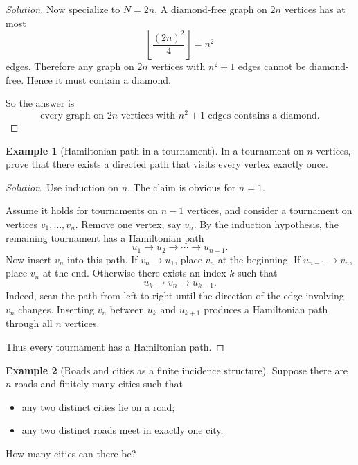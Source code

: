 \documentclass[11pt]{article}
\theoremstyle{definition}
\newtheorem{example}{Example}[section]
\begin{document}
\begin{proof}[Solution]
Now specialize to $N=2n$. A diamond-free graph on $2n$ vertices has at most
\[
\left\lfloor \frac{(2n)^2}{4}\right\rfloor = n^2
\]
edges. Therefore any graph on $2n$ vertices with $n^2+1$ edges cannot be diamond-free. Hence it must contain a diamond.

So the answer is
\[
\boxed{\text{every graph on }2n\text{ vertices with }n^2+1\text{ edges contains a diamond}.}
\]
\end{proof}

\begin{example}[Hamiltonian path in a tournament]
In a tournament on $n$ vertices, prove that there exists a directed path that visits every vertex exactly once.
\end{example}

\begin{proof}[Solution]
Use induction on $n$. The claim is obvious for $n=1$.

Assume it holds for tournaments on $n-1$ vertices, and consider a tournament on vertices $v_1,\dots,v_n$. Remove one vertex, say $v_n$. By the induction hypothesis, the remaining tournament has a Hamiltonian path
\[
u_1 \to u_2 \to \cdots \to u_{n-1}.
\]
Now insert $v_n$ into this path. If $v_n\to u_1$, place $v_n$ at the beginning. If $u_{n-1}\to v_n$, place $v_n$ at the end. Otherwise there exists an index $k$ such that
\[
u_k \to v_n \to u_{k+1}.
\]
Indeed, scan the path from left to right until the direction of the edge involving $v_n$ changes. Inserting $v_n$ between $u_k$ and $u_{k+1}$ produces a Hamiltonian path through all $n$ vertices.

Thus every tournament has a Hamiltonian path.
\end{proof}

\begin{example}[Roads and cities as a finite incidence structure]
Suppose there are $n$ roads and finitely many cities such that
\begin{itemize}
    \item any two distinct cities lie on a road;
    \item any two distinct roads meet in exactly one city.
\end{itemize}
How many cities can there be?
\end{example}
\end{document}
